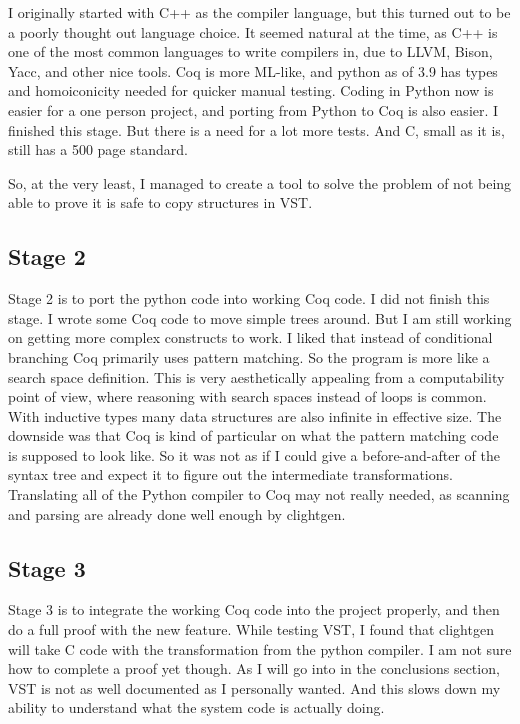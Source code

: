 I originally started with C++ as the compiler language, but this turned out to be a poorly thought out language choice. It seemed natural at the time, as C++ is one of the most common languages to write compilers in, due to LLVM, Bison, Yacc, and other nice tools. Coq is more ML-like, and python as of 3.9 has types and homoiconicity needed for quicker manual testing. Coding in Python now is easier for a one person project, and porting from Python to Coq is also easier. I finished this stage. But there is a need for a lot more tests. And C, small as it is, still has a 500 page standard.

So, at the very least, I managed to create a tool to solve the problem of not being able to prove it is safe to copy structures in VST.

\subsection{Stage 2}

Stage 2 is to port the python code into working Coq code. I did not finish this stage. I wrote some Coq code to move simple trees around. But I am still working on getting more complex constructs to work. I liked that instead of conditional branching Coq primarily uses pattern matching. So the program is more like a search space definition. This is very aesthetically appealing from a computability point of view, where reasoning with search spaces instead of loops is common. With inductive types many data structures are also infinite in effective size. The downside was that Coq is kind of particular on what the pattern matching code is supposed to look like. So it was not as if I could give a before-and-after of the syntax tree and expect it to figure out the intermediate transformations. Translating all of the Python compiler to Coq may not really needed, as scanning and parsing are already done well enough by clightgen.

\subsection{Stage 3}

Stage 3 is to integrate the working Coq code into the project properly, and then do a full proof with the new feature. While testing VST, I found that clightgen will take C code with the transformation from the python compiler. I am not sure how to complete a proof yet though. As I will go into in the conclusions section, VST is not as well documented as I personally wanted. And this slows down my ability to understand what the system code is actually doing.
